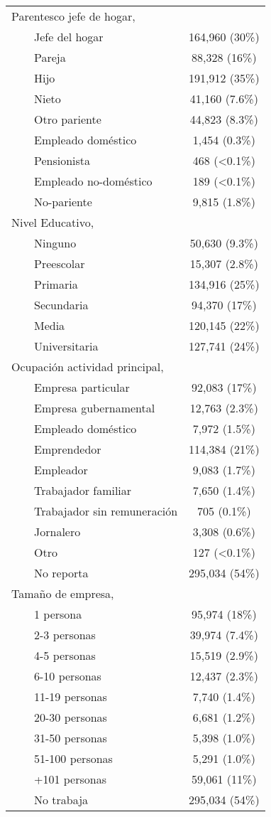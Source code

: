 \begin{longtable}{lc}
Parentesco jefe de hogar,  &  \\ 
    Jefe del hogar & 164,960  (30\%) \\ 
    Pareja & 88,328  (16\%) \\ 
    Hijo & 191,912  (35\%) \\ 
    Nieto & 41,160  (7.6\%) \\ 
    Otro pariente & 44,823  (8.3\%) \\ 
    Empleado doméstico & 1,454  (0.3\%) \\ 
    Pensionista & 468  (<0.1\%) \\ 
    Empleado no-doméstico & 189  (<0.1\%) \\ 
    No-pariente & 9,815  (1.8\%) \\ 
Nivel Educativo,  &  \\ 
    Ninguno & 50,630  (9.3\%) \\ 
    Preescolar & 15,307  (2.8\%) \\ 
    Primaria & 134,916  (25\%) \\ 
    Secundaria & 94,370  (17\%) \\ 
    Media & 120,145  (22\%) \\ 
    Universitaria & 127,741  (24\%) \\ 
Ocupación actividad principal,  &  \\ 
    Empresa particular & 92,083  (17\%) \\ 
    Empresa gubernamental & 12,763  (2.3\%) \\ 
    Empleado doméstico & 7,972  (1.5\%) \\ 
    Emprendedor & 114,384  (21\%) \\ 
    Empleador & 9,083  (1.7\%) \\ 
    Trabajador familiar & 7,650  (1.4\%) \\ 
    Trabajador sin remuneración & 705  (0.1\%) \\ 
    Jornalero & 3,308  (0.6\%) \\ 
    Otro & 127  (<0.1\%) \\ 
    No reporta & 295,034  (54\%) \\ 
Tamaño de empresa,  &  \\ 
    1 persona & 95,974  (18\%) \\ 
    2-3 personas & 39,974  (7.4\%) \\ 
    4-5 personas & 15,519  (2.9\%) \\ 
    6-10 personas & 12,437  (2.3\%) \\ 
    11-19 personas & 7,740  (1.4\%) \\ 
    20-30 personas & 6,681  (1.2\%) \\ 
    31-50 personas & 5,398  (1.0\%) \\ 
    51-100 personas & 5,291  (1.0\%) \\ 
    +101 personas & 59,061  (11\%) \\ 
    No trabaja & 295,034  (54\%) \\ 
\bottomrule
\end{longtable}

